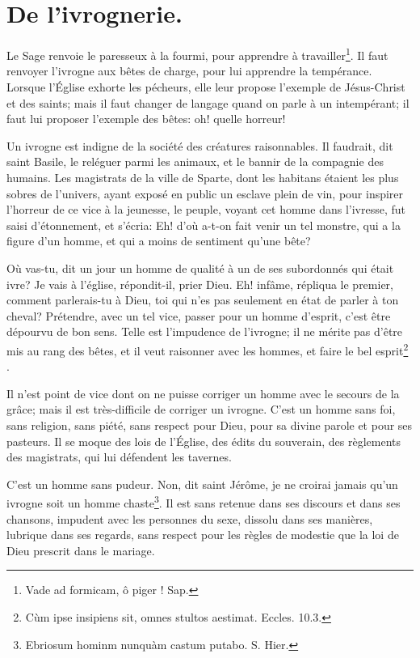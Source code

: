 \documentclass[instructions.tex]{subfiles}
\begin{document}
 
\chapter{De l'ivrognerie.}
 
\primo Le Sage renvoie le paresseux à la fourmi, pour apprendre à travailler\footnote{Vade ad formicam, ô piger ! Sap.}. Il faut renvoyer l'ivrogne aux bêtes de charge, pour lui apprendre la tempérance. Lorsque l'Église exhorte les pécheurs, elle leur propose l'exemple de Jésus-Christ et des saints; mais il faut changer de langage quand on parle à un intempérant; il faut lui proposer l'exemple des bêtes: oh! quelle horreur!
 
Un ivrogne est indigne de la société des créatures raisonnables. Il faudrait, dit saint Basile, le reléguer parmi les animaux, et le bannir de la compagnie des humains. Les magistrats de la ville de Sparte, dont les habitans étaient les plus sobres de l'univers, ayant exposé en public un esclave plein de vin, pour inspirer l'horreur de ce vice à la jeunesse, le peuple, voyant cet homme dans l'ivresse, fut saisi d'étonnement, et s'écria: Eh! d'où a-t-on fait venir un tel monstre, qui a la figure d'un homme, et qui a moins de sentiment qu'une bête?
 
Où vas-tu, dit un jour un homme de qualité à un de ses subordonnés qui était ivre? Je vais à l'église, répondit-il, prier Dieu. Eh! infâme, répliqua le premier, comment parlerais-tu à Dieu, toi qui n'es pas seulement en état de parler à ton cheval? Prétendre, avec un tel vice, passer pour un homme d'esprit, c'est être dépourvu de bon sens. Telle est l'impudence de l'ivrogne; il ne mérite pas d'être mis au rang des bêtes, et il veut raisonner avec les hommes, et faire le bel esprit\footnote{Cùm ipse insipiens sit, omnes stultos aestimat. Eccles. 10.3.} .
 
\secundo Il n'est point de vice dont on ne puisse corriger un homme avec le secours de la grâce; mais il est très-difficile de corriger un ivrogne. C'est un homme sans foi, sans religion, sans piété, sans respect pour Dieu, pour sa divine parole et pour ses pasteurs. Il se moque des lois de l'Église, des édits du souverain, des règlements des magistrats, qui lui défendent les tavernes.
 
C'est un homme sans pudeur. Non, dit saint Jérôme, je ne croirai jamais qu'un ivrogne soit un homme chaste\footnote{Ebriosum hominm nunquàm castum putabo. S. Hier.}. Il est sans retenue dans ses discours et dans ses chansons, impudent avec les personnes du sexe, dissolu dans ses manières, lubrique dans ses regards, sans respect pour les règles de modestie que la loi de Dieu prescrit dans le mariage.
 
\end{document}
